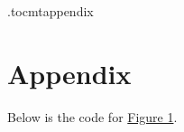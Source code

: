 \newpage
\appendix*
\newpage
\etocdepthtag.toc{mtappendix}
\tableofcontents
\newpage

\chapter{Appendix}
Below is the code for \hyperlink{fig:discrete-gauss}{Figure 1}.
\label{app:code}


